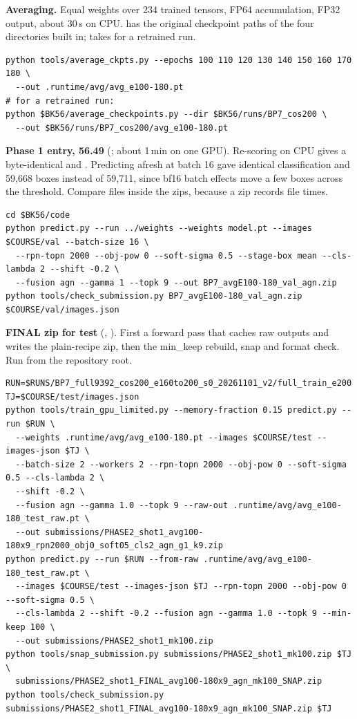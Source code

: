 \textbf{Averaging.} Equal weights over 234 trained tensors, FP64 accumulation, FP32 output, about 30\,s on CPU.  has the original checkpoint paths of the four directories built in;  takes  for a retrained run.

{\footnotesize
\begin{verbatim}
python tools/average_ckpts.py --epochs 100 110 120 130 140 150 160 170 180 \
  --out .runtime/avg/avg_e100-180.pt
# for a retrained run:
python $BK56/average_checkpoints.py --dir $BK56/runs/BP7_cos200 \
  --out $BK56/runs/BP7_cos200/avg_e100-180.pt
\end{verbatim}
}

\textbf{Phase 1 entry, 56.49} (; about 1\,min on one GPU). Re-scoring  on CPU gives a byte-identical  and . Predicting afresh at batch 16 gave identical classification and 59,668 boxes instead of 59,711, since bf16 batch effects move a few boxes across the threshold. Compare files inside the zips, because a zip records file times.

{\footnotesize
\begin{verbatim}
cd $BK56/code
python predict.py --run ../weights --weights model.pt --images $COURSE/val --batch-size 16 \
  --rpn-topn 2000 --obj-pow 0 --soft-sigma 0.5 --stage-box mean --cls-lambda 2 --shift -0.2 \
  --fusion agn --gamma 1 --topk 9 --out BP7_avgE100-180_val_agn.zip
python tools/check_submission.py BP7_avgE100-180_val_agn.zip $COURSE/val/images.json
\end{verbatim}
}

\textbf{FINAL zip for test} (\fl{$PH2/watch_test_release.sh}, ). First a forward pass that caches raw outputs and writes the plain-recipe zip, then the min\_keep rebuild, snap and format check. Run from the repository root.

{\footnotesize
\begin{verbatim}
RUN=$RUNS/BP7_full9392_cos200_e160to200_s0_20261101_v2/full_train_e200
TJ=$COURSE/test/images.json
python tools/train_gpu_limited.py --memory-fraction 0.15 predict.py --run $RUN \
  --weights .runtime/avg/avg_e100-180.pt --images $COURSE/test --images-json $TJ \
  --batch-size 2 --workers 2 --rpn-topn 2000 --obj-pow 0 --soft-sigma 0.5 --cls-lambda 2 \
  --shift -0.2 \
  --fusion agn --gamma 1.0 --topk 9 --raw-out .runtime/avg/avg_e100-180_test_raw.pt \
  --out submissions/PHASE2_shot1_avg100-180x9_rpn2000_obj0_soft05_cls2_agn_g1_k9.zip
python predict.py --run $RUN --from-raw .runtime/avg/avg_e100-180_test_raw.pt \
  --images $COURSE/test --images-json $TJ --rpn-topn 2000 --obj-pow 0 --soft-sigma 0.5 \
  --cls-lambda 2 --shift -0.2 --fusion agn --gamma 1.0 --topk 9 --min-keep 100 \
  --out submissions/PHASE2_shot1_mk100.zip
python tools/snap_submission.py submissions/PHASE2_shot1_mk100.zip $TJ \
  submissions/PHASE2_shot1_FINAL_avg100-180x9_agn_mk100_SNAP.zip
python tools/check_submission.py submissions/PHASE2_shot1_FINAL_avg100-180x9_agn_mk100_SNAP.zip $TJ
\end{verbatim}
}

